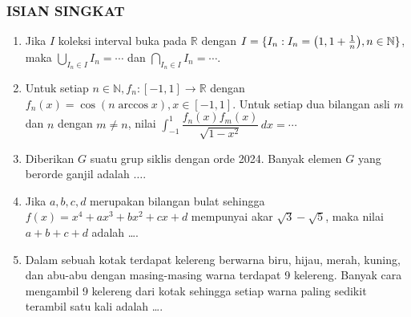 \documentclass[12pt,twoside]{article}
\newcommand{\R}{\mathbb{R}}
\begin{document}
\subsubsection*{ISIAN SINGKAT}
\begin{enumerate}
	\item Jika $I$ koleksi interval buka pada $\R$ dengan $I=\{I_n:I_n=\qty(1,1+\frac{1}{n}),n\in\mathbb{N}\}$, maka $\displaystyle \bigcup_{I_n\in I} I_n=\cdots$ dan $\displaystyle \bigcap_{I_n\in I} I_n=\cdots$.
	\item Untuk setiap $n\in\mathbb{N}, f_n:[-1,1]\rightarrow \R$ dengan $f_n(x)=\cos(n\arccos x), x\in[-1,1]$. Untuk setiap dua bilangan asli $m$ dan $n$ dengan $m\neq n$, nilai $\displaystyle\int_{-1}^1 \dfrac{f_n(x)f_m(x)}{\sqrt{1-x^2}}\, dx=\cdots$
	\item Diberikan $G$ suatu grup siklis dengan orde 2024. Banyak elemen $G$ yang berorde ganjil adalah $\dots$.
	\item Jika $a,b,c,d$ merupakan bilangan bulat sehingga $f(x)=x^4+ax^3+bx^2+cx+d$ mempunyai akar $\sqrt{3}-\sqrt{5}$, maka nilai $a+b+c+d$ adalah \dots.
	\item Dalam sebuah kotak terdapat kelereng berwarna biru, hijau, merah, kuning, dan abu-abu dengan masing-masing warna terdapat 9 kelereng. Banyak cara mengambil 9 kelereng dari kotak sehingga setiap warna paling sedikit terambil satu kali adalah \dots.
\end{enumerate}
\end{document}
